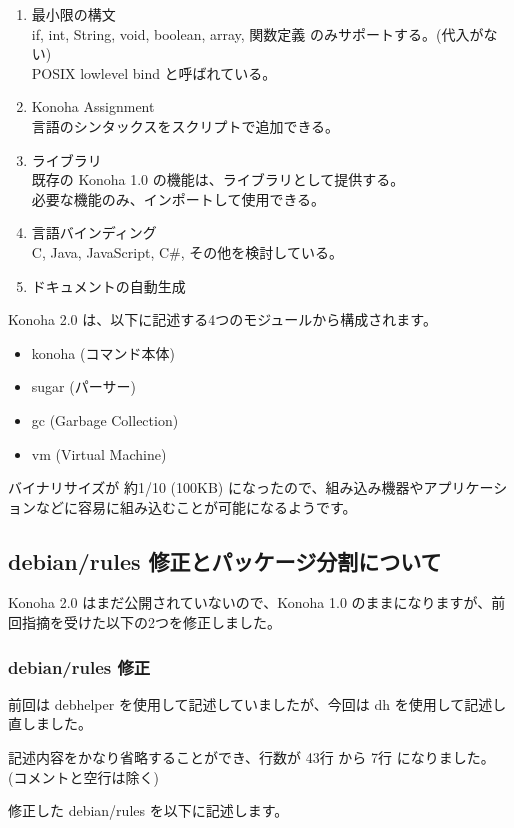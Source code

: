 \documentclass[mingoth,a4paper]{jsarticle}
\begin{document}
\begin{enumerate}
\item 最小限の構文\\
  if, int, String, void, boolean, array, 関数定義 のみサポートする。(代入がない)\\
  POSIX lowlevel bind と呼ばれている。
\item Konoha Assignment\\
  言語のシンタックスをスクリプトで追加できる。
\item ライブラリ\\
  既存の Konoha 1.0 の機能は、ライブラリとして提供する。\\
  必要な機能のみ、インポートして使用できる。
\item 言語バインディング\\
  C, Java, JavaScript, C\#, その他を検討している。
\item ドキュメントの自動生成
\end{enumerate}

Konoha 2.0 は、以下に記述する4つのモジュールから構成されます。
\begin{itemize}
\item konoha (コマンド本体)
\item sugar (パーサー)
\item gc (Garbage Collection)
\item vm (Virtual Machine)
\end{itemize}

バイナリサイズが 約1/10 (100KB) になったので、組み込み機器やアプリケーションなどに容易に組み込むことが可能になるようです。

\subsection{debian/rules 修正とパッケージ分割について}
Konoha 2.0 はまだ公開されていないので、Konoha 1.0 のままになりますが、前回指摘を受けた以下の2つを修正しました。

\subsubsection{debian/rules 修正}
前回は debhelper を使用して記述していましたが、今回は dh を使用して記述し直しました。

記述内容をかなり省略することができ、行数が 43行 から 7行 になりました。
(コメントと空行は除く)

修正した debian/rules を以下に記述します。
\end{document}
